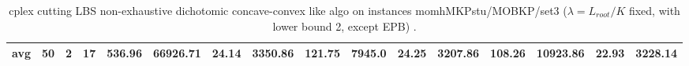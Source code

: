 \begin{sidewaystable}[!ht]
{\begin{tabular}{lccccccccccccccc}
\cline{1-16} \textbf{avg} & \textbf{50} & \textbf{2} & \textbf{17} & \textbf{536.96} & \textbf{66926.71} & \textbf{24.14} & \textbf{3350.86} & \textbf{121.75} & \textbf{7945.0} & \textbf{24.25} & \textbf{3207.86} & \textbf{108.26} & \textbf{10923.86} & \textbf{22.93} & \textbf{3228.14} \\ \cline{1-16}
\bottomrule
\end{tabular}
}%
\caption{cplex cutting LBS non-exhaustive dichotomic concave-convex like algo on instances momhMKPstu/MOBKP/set3 ($\lambda = L_{root}/K$ fixed, with lower bound 2, except EPB)  .}
\label{tab:table_LBS_factor3_momhMKPstu/MOBKP/set3 }
\end{sidewaystable}
